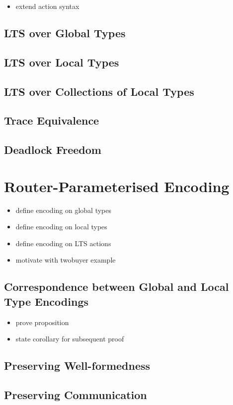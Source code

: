 \begin{itemize}
\item extend action syntax
\end{itemize}

\subsection{LTS over Global Types}

\subsection{LTS over Local Types}

\subsection{LTS over Collections of Local Types}

\subsection{Trace Equivalence}

\subsection{Deadlock Freedom}

\section{Router-Parameterised Encoding}
\label{section:encoding}

\begin{itemize}
\item define encoding on global types
\item define encoding on local types
\item define encoding on LTS actions
\item motivate with twobuyer example
\end{itemize}

\subsection{Correspondence between Global and Local Type Encodings}
\begin{itemize}
\item prove proposition
\item state corollary for subsequent proof
\end{itemize}

\subsection{Preserving Well-formedness}

\subsection{Preserving Communication}